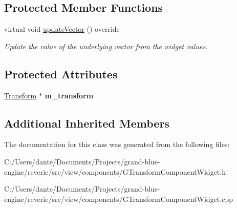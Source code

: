 \subsection*{Protected Member Functions}
\begin{DoxyCompactItemize}
\item 
\mbox{\label{classrev_1_1_view_1_1_scale_widget_a15799fd3b4e5be9c5d4298289a8d763e}} 
virtual void \mbox{\hyperlink{classrev_1_1_view_1_1_scale_widget_a15799fd3b4e5be9c5d4298289a8d763e}{update\+Vector}} () override
\begin{DoxyCompactList}\small\item\em Update the value of the underlying vector from the widget values. \end{DoxyCompactList}\end{DoxyCompactItemize}
\subsection*{Protected Attributes}
\begin{DoxyCompactItemize}
\item 
\mbox{\label{classrev_1_1_view_1_1_scale_widget_a7bbe780e7847f5ef4f602f4de6ee0899}} 
\mbox{\hyperlink{classrev_1_1_transform}{Transform}} $\ast$ {\bfseries m\+\_\+transform}
\end{DoxyCompactItemize}
\subsection*{Additional Inherited Members}


The documentation for this class was generated from the following files\+:\begin{DoxyCompactItemize}
\item 
C\+:/\+Users/dante/\+Documents/\+Projects/grand-\/blue-\/engine/reverie/src/view/components/G\+Transform\+Component\+Widget.\+h\item 
C\+:/\+Users/dante/\+Documents/\+Projects/grand-\/blue-\/engine/reverie/src/view/components/G\+Transform\+Component\+Widget.\+cpp\end{DoxyCompactItemize}
